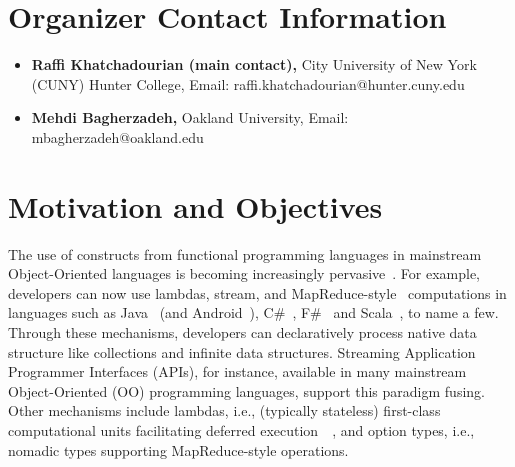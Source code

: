 \documentclass[10pt, conference]{IEEEtran}
\begin{document}
\maketitle

\begin{abstract}
	
\end{abstract}


\section{Organizer Contact Information}

\begin{itemize}
	\item \textbf{Raffi Khatchadourian (main contact),} City University of New York (CUNY) Hunter College, Email: raffi.khatchadourian@hunter.cuny.edu
	\item \textbf{Mehdi Bagherzadeh,} Oakland University, Email: mbagherzadeh@oakland.edu
\end{itemize}

\section{Motivation and Objectives}

The use of constructs from functional programming languages in mainstream Object-Oriented languages is becoming increasingly pervasive~\cite{Biboudis2015}. For example, developers can now use lambdas, stream, and MapReduce-style~\cite{Dean2008} computations in languages such as Java~\cite{OracleCorporation2017} (and Android~\cite{Lau2017}), C\#~\cite{Microsoft2018}, F\#~\cite{fsharp} and Scala~\cite{Lausanne2015}, to name a few. Through these mechanisms, developers can declaratively process native data structure like collections and infinite data structures. Streaming Application Programmer Interfaces (APIs), for instance, available in many mainstream Object-Oriented (OO) programming languages, support this paradigm fusing. Other mechanisms include lambdas, i.e., (typically stateless) first-class computational units facilitating deferred execution~~\cite{OracleCorporation2015,Wagner2017}, and option types, i.e., nomadic types supporting MapReduce-style operations.
\end{document}
